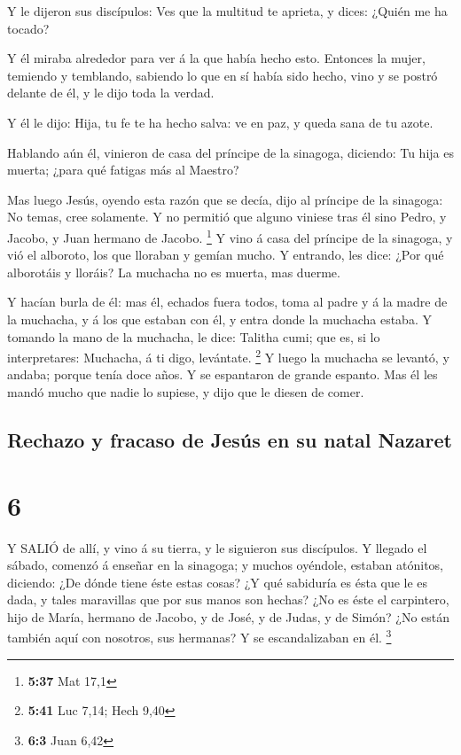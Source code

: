  Y le dijeron sus discípulos: Ves que la multitud te
aprieta, y dices: ¿Quién me ha tocado?

 Y él miraba alrededor para ver á la que había hecho esto.
 Entonces la mujer, temiendo y temblando, sabiendo lo que
en sí había sido hecho, vino y se postró delante de él, y le dijo toda
la verdad.

 Y él le dijo: Hija, tu fe te ha hecho salva: ve en paz, y
queda sana de tu azote.

 Hablando aún él, vinieron de casa del príncipe de la
sinagoga, diciendo: Tu hija es muerta; ¿para qué fatigas más al Maestro?

 Mas luego Jesús, oyendo esta razón que se decía, dijo al
príncipe de la sinagoga: No temas, cree solamente.  Y no
permitió que alguno viniese tras él sino Pedro, y Jacobo, y Juan hermano
de Jacobo. \footnote{\textbf{5:37} Mat 17,1}  Y vino á casa
del príncipe de la sinagoga, y vió el alboroto, los que lloraban y
gemían mucho.  Y entrando, les dice: ¿Por qué alborotáis y
lloráis? La muchacha no es muerta, mas duerme.

 Y hacían burla de él: mas él, echados fuera todos, toma al
padre y á la madre de la muchacha, y á los que estaban con él, y entra
donde la muchacha estaba.  Y tomando la mano de la
muchacha, le dice: Talitha cumi; que es, si lo interpretares: Muchacha,
á ti digo, levántate. \footnote{\textbf{5:41} Luc 7,14; Hech 9,40}
 Y luego la muchacha se levantó, y andaba; porque tenía
doce años. Y se espantaron de grande espanto.  Mas él les
mandó mucho que nadie lo supiese, y dijo que le diesen de comer.

\hypertarget{rechazo-y-fracaso-de-jesuxfas-en-su-natal-nazaret}{%
\subsection{Rechazo y fracaso de Jesús en su natal
Nazaret}\label{rechazo-y-fracaso-de-jesuxfas-en-su-natal-nazaret}}

\hypertarget{section-5}{%
\section{6}\label{section-5}}

 Y SALIÓ de allí, y vino á su tierra, y le siguieron sus
discípulos.  Y llegado el sábado, comenzó á enseñar en la
sinagoga; y muchos oyéndole, estaban atónitos, diciendo: ¿De dónde tiene
éste estas cosas? ¿Y qué sabiduría es ésta que le es dada, y tales
maravillas que por sus manos son hechas?  ¿No es éste el
carpintero, hijo de María, hermano de Jacobo, y de José, y de Judas, y
de Simón? ¿No están también aquí con nosotros, sus hermanas? Y se
escandalizaban en él. \footnote{\textbf{6:3} Juan 6,42}

